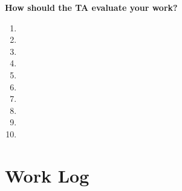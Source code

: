 \documentclass[10pt,onecolumn,draftclsnofoot]{IEEEtran} %
\begin{document}
\begin{singlespace}
        \textbf{How should the TA evaluate your work?}\\

	\begin{enumerate}
                \item  
                \item 
                \item 
		\item
		\item
		\item
		\item
		\item
		\item
		\item
        \end{enumerate}

\newpage
\section{\bf Work Log}

                

\newpage


\end{singlespace}
\restoregeometry
\end{document}
